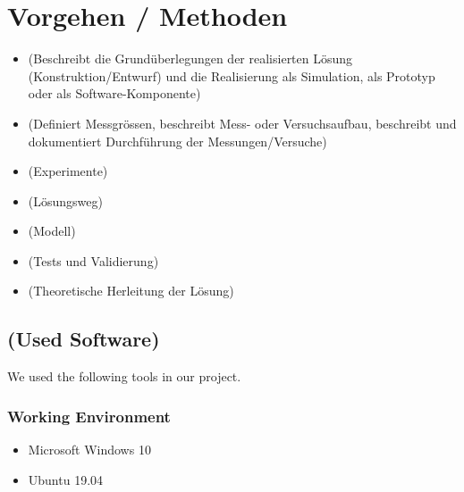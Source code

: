 %
%

\chapter{Vorgehen / Methoden}\label{chap.vorgehen}


\begin{itemize}
\item (Beschreibt die Grundüberlegungen der realisierten Lösung (Konstruktion/Entwurf) und die Realisierung als Simulation, als Prototyp oder als Software-Komponente)
\item (Definiert Messgrössen, beschreibt Mess- oder Versuchsaufbau, beschreibt und dokumentiert Durchführung der Messungen/Versuche)
\item (Experimente)
\item (Lösungsweg)
\item (Modell)
\item (Tests und Validierung)
\item (Theoretische Herleitung der Lösung)
\end{itemize}

\section{(Used Software)}\label{software}
We used the following tools in our project.

\subsection*{Working Environment}\label{os}
\begin{itemize}
	\item Microsoft Windows 10
	\item Ubuntu 19.04
\end{itemize}

